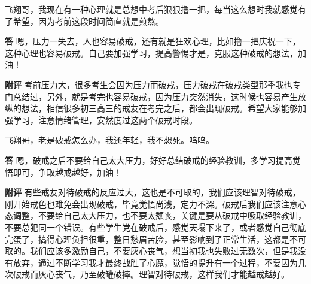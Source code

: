 \begin{case}
    飞翔哥，我现在有一种心理就是总想中考后狠狠撸一把，每当这么想时我就感觉有了希望，因为考前这段时间简直就是煎熬。

    \textbf{答} 嗯，压力一失去，人也容易破戒，还有就是狂欢心理，比如撸一把庆祝一下，这种心理也容易破戒。自己要加强学习，提高警惕才是，克服这种破戒的想法，加油！

    \textbf{附评} 考前压力大，很多考生会因为压力而破戒，压力破戒在破戒类型那季我也专门总结过，另外，就是考完也容易破戒，因为压力突然消失，这时候也容易产生放纵的想法，相信很多初三高三的戒友在考完之后，都会出现破戒。希望大家能够加强学习，注意情绪管理，安然度过这两个破戒时段。
\end{case}

\begin{case}
    飞翔哥，老是破戒怎么办，我还年轻，我不想死。呜呜。

    \textbf{答} 嗯，破戒之后不要给自己太大压力，好好总结破戒的经验教训，多学习提高觉悟即可，争取越戒越好，加油！

    \textbf{附评} 有些戒友对待破戒的反应过大，这也是不可取的，我们应该理智对待破戒，刚开始戒色也难免会出现破戒，毕竟觉悟尚浅，定力不深。破戒后我们应该注意心态调整，不要给自己太大压力，也不要太颓丧，关键是要从破戒中吸取经验教训，不要总犯同一个错误。有些学生党在破戒后，感觉天塌下来了，或者感觉自己彻底完蛋了，搞得心理负担很重，整日愁眉苦脸，甚至影响到了正常生活，这都是不可取的。我们应该多激励自己，不要灰心丧气，想当初我也失败过无数次，但是我没有放弃，通过不断学习我才最终战胜了心魔，觉悟的提升有一个过程，不要因为几次破戒而灰心丧气，乃至破罐破摔。理智对待破戒，这样我们才能越戒越好。
\end{case}

